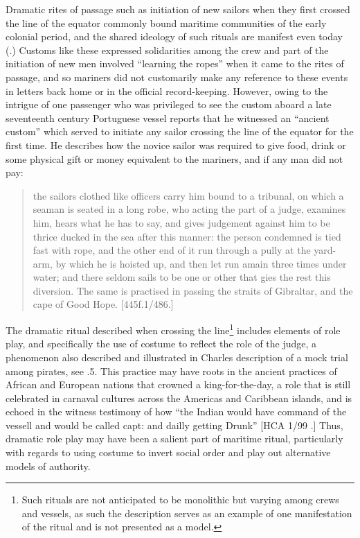   Dramatic rites of passage such as initiation of new sailors when they first crossed the line of the equator commonly bound maritime communities of the early colonial period, and the shared ideology of such rituals are manifest even today (\citealt{Bronner2006}.) Customs like these expressed solidarities among the crew and part of the initiation of new men involved “learning the ropes” when it came to the rites of passage, and so mariners did not customarily make any reference to these events in letters back home or in the official record-keeping. However, owing to the intrigue of one passenger who was privileged to see the custom aboard a late seventeenth century Portuguese vessel reports that he witnessed an “ancient custom” which served to initiate any sailor crossing the line of the equator for the first time. He describes how the novice sailor was required to give food, drink or some physical gift or money equivalent to the mariners, and if any man did not pay: 

\begin{quotation}
the sailors clothed like officers carry him bound to a tribunal, on which a seaman is seated in a long robe, who acting the part of a judge, examines him, hears what he has to say, and gives judgement against him to be thrice ducked in the sea after this manner: the person condemned is tied fast with rope, and the other end of it run through a pully at the yard-arm, by which he is hoisted up, and then let run amain three times under water; and there seldom sails to be one or other that gies the rest this diversion. The same is practised in passing the straits of Gibraltar, and the cape of Good Hope. [445f.1/486.] \end{quotation}

The dramatic ritual described when crossing the line\footnote{Such rituals are not anticipated to be monolithic but varying among crews and vessels, as such the description serves as an example of one manifestation of the ritual and is not presented as a model.}  includes elements of role play, and specifically the use of costume to reflect the role of the judge, a phenomenon also described and illustrated in Charles  description of a mock trial among pirates, see .5. This practice may have roots in the ancient practices of African and European nations that crowned a king-for-the-day, a role that is still celebrated in carnaval cultures across the Americas and Caribbean islands, and is echoed in the witness testimony of how “the Indian would have command of the vessell and would be called capt: and dailly getting Drunk” [HCA 1/99 \citealt{Barbados1733}.] Thus, dramatic role play may have been a salient part of maritime ritual, particularly with regards to using costume to invert social order and play out alternative models of authority. 

